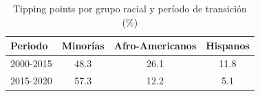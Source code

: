 \begin{table}[ht]
\centering
\caption{Tipping points por grupo racial y período de transición (\%)} 
\label{tab:tipping}
\begin{tabular}{lccc}
  \toprule
Periodo & Minorías & Afro-Americanos & Hispanos \\ 
  \midrule
2000-2015 & 48.3 & 26.1 & 11.8 \\ 
  2015-2020 & 57.3 & 12.2 & 5.1 \\ 
   \bottomrule
\end{tabular}
\end{table}
